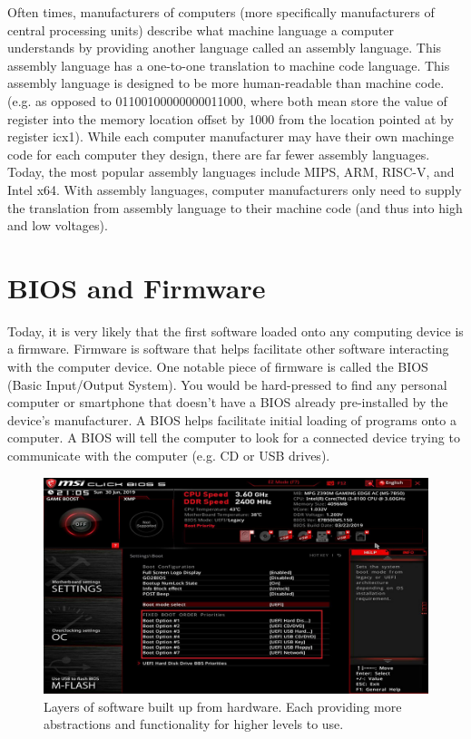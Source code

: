 Often times, manufacturers of computers (more specifically manufacturers of central processing units)
describe what machine language a computer understands by providing another language called
an assembly language. This assembly language has a one-to-one translation to machine code language.
This assembly language is designed to be more human-readable than machine code. (e.g. 
as opposed to 01100100000000011000, where both mean store the value of register  into the memory location
offset by 1000 from the location pointed at by register ic{x1}). While each computer manufacturer may
have their own machinge code for each computer they design, there are far fewer assembly languages.
Today, the most popular assembly languages include MIPS, ARM, RISC-V, and Intel x64. With assembly
languages, computer manufacturers only need to supply the translation from assembly language
to their machine code (and thus into high and low voltages).

\section{BIOS and Firmware}
Today, it is very likely that the first software loaded onto any computing device is a firmware.
Firmware is software that helps facilitate other software interacting with the computer device.
One notable piece of firmware is called the BIOS (Basic Input/Output System). You would be hard-pressed
to find any personal computer or smartphone that doesn't have a BIOS already pre-installed by
the device's manufacturer. A BIOS helps facilitate initial loading of programs onto a computer.
A BIOS will tell the computer to look for a connected device trying to communicate with the
computer (e.g. CD or USB drives). 

\begin{figure}
    \centering
    \includegraphics[width=12cm]{images/bios.jpg}
    \caption{Layers of software built up from hardware. Each providing more abstractions and functionality for higher levels to use.}
    \label{fig:hw_sw:bios}
\end{figure}

